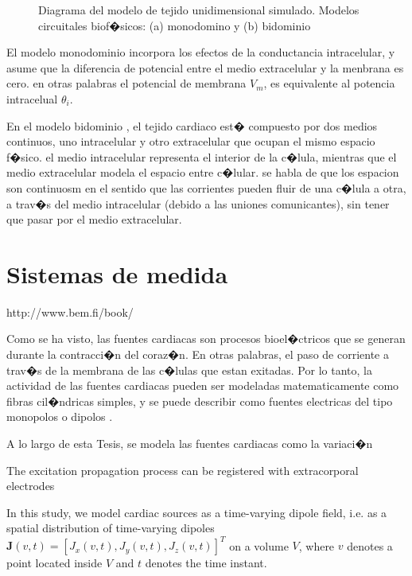 \begin{figure}
\centering
\caption{Diagrama del modelo de tejido unidimensional simulado. Modelos
circuitales biof�sicos: (a) monodomino y (b) bidominio}
  \label{fig:mono_bidominio}
\end{figure}


El modelo monodominio incorpora los efectos de la conductancia
intracelular, y asume que la diferencia de potencial entre el medio extracelular  y la
menbrana es cero. en otras palabras el potencial de membrana $V_m$, es equivalente al
potencia intracelual $\theta_i$. 


En el modelo bidominio \cite{henriquez1992, miller1978}, el tejido cardiaco est�
compuesto por dos medios continuos, uno intracelular y otro extracelular que ocupan el
mismo espacio f�sico. el medio intracelular representa el interior de la c�lula,
mientras que el medio extracelular modela el espacio entre c�lular. se habla de
que los espacion son continuosm en el sentido  que las corrientes pueden fluir
de una c�lula a otra, a trav�s del medio intracelular (debido a las uniones
comunicantes), sin tener que pasar por el medio extracelular. 





\section{Sistemas de medida}


http://www.bem.fi/book/

Como se ha visto, las fuentes cardiacas son procesos bioel�ctricos que se generan 
durante la contracci�n del coraz�n. En otras palabras, el paso de corriente a trav�s de la 
membrana de las c�lulas que estan exitadas. Por lo tanto, la actividad de las fuentes
cardiacas pueden ser modeladas matematicamente como fibras cil�ndricas simples, y se puede describir
como fuentes electricas del tipo monopolos o dipolos  \cite{Malmivuo95}.



A lo largo de esta Tesis, se modela las fuentes cardiacas como la variaci�n




The excitation propagation process can be registered with extracorporal
electrodes

In this study, we model cardiac sources as a
time-varying dipole field, i.e. as a spatial distribution of time-varying
dipoles $\mathbf{J}(v,t)= [J_x(v,t), J_y(v,t), J_z(v,t)]^T$ on a volume $V$,
where $v$ denotes a point located inside $V$ and $t$ denotes the time instant.

